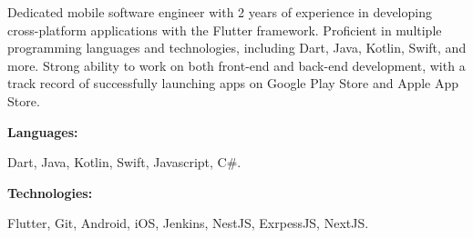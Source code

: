 \documentclass[9pt]{developercv} %
\begin{document}
\begin{minipage}[t]{0.46\textwidth}
	\vspace{-6pt}

	Dedicated mobile software engineer with 2 years of experience in developing cross-platform applications with the Flutter framework. Proficient in multiple programming languages and technologies, including Dart, Java, Kotlin, Swift, and more. Strong ability to work on both front-end and back-end development, with a track record of successfully launching apps on Google Play Store and Apple App Store.

\end{minipage}
\hfill %
\begin{minipage}[t]{0.465\textwidth}
	\vspace{-6pt}

	\begin{minipage}[t]{0.2\textwidth}
		\textbf{Languages:}
	\end{minipage}
	\hfill
	\begin{minipage}[t]{0.73\textwidth}
		Dart, Java, Kotlin, Swift, Javascript, C\#.
	\end{minipage}
	\vspace{4mm}

	\begin{minipage}[t]{0.2\textwidth}
		\textbf{Technologies:}
	\end{minipage}
	\hfill
	\begin{minipage}[t]{0.73\textwidth}
		Flutter, Git, Android, iOS, Jenkins, NestJS, ExrpessJS, NextJS.
	\end{minipage}

\end{minipage}
\end{document}
